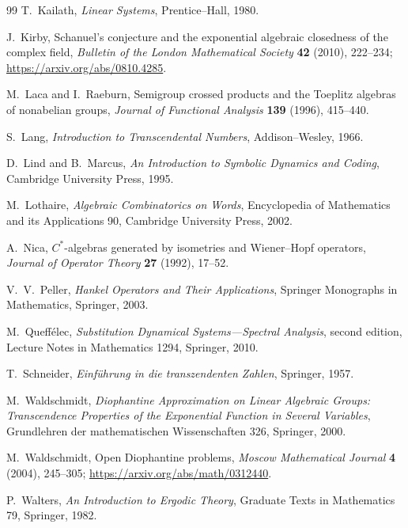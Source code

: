 \documentclass[11pt,oneside]{article}
\theoremstyle{definition}
\theoremstyle{remark}
\begin{document}
\begin{thebibliography}{99}
T.~Kailath,
\newblock \emph{Linear Systems},
\newblock Prentice--Hall, 1980.

J.~Kirby,
\newblock Schanuel's conjecture and the exponential algebraic closedness
of the complex field,
\newblock \emph{Bulletin of the London Mathematical Society}
\textbf{42} (2010), 222--234;
\newblock \url{https://arxiv.org/abs/0810.4285}.

M.~Laca and I.~Raeburn,
\newblock Semigroup crossed products and the Toeplitz algebras of
nonabelian groups,
\newblock \emph{Journal of Functional Analysis} \textbf{139} (1996),
415--440.

S.~Lang,
\newblock \emph{Introduction to Transcendental Numbers},
\newblock Addison--Wesley, 1966.

D.~Lind and B.~Marcus,
\newblock \emph{An Introduction to Symbolic Dynamics and Coding},
\newblock Cambridge University Press, 1995.

M.~Lothaire,
\newblock \emph{Algebraic Combinatorics on Words},
\newblock Encyclopedia of Mathematics and its Applications 90,
Cambridge University Press, 2002.

A.~Nica,
\newblock \(C^*\)-algebras generated by isometries and Wiener--Hopf
operators,
\newblock \emph{Journal of Operator Theory} \textbf{27} (1992), 17--52.

V.~V.~Peller,
\newblock \emph{Hankel Operators and Their Applications},
\newblock Springer Monographs in Mathematics, Springer, 2003.

M.~Queff\'elec,
\newblock \emph{Substitution Dynamical Systems---Spectral Analysis},
\newblock second edition, Lecture Notes in Mathematics 1294, Springer,
2010.

T.~Schneider,
\newblock \emph{Einf\"uhrung in die transzendenten Zahlen},
\newblock Springer, 1957.

M.~Waldschmidt,
\newblock \emph{Diophantine Approximation on Linear Algebraic Groups:
Transcendence Properties of the Exponential Function in Several
Variables},
\newblock Grundlehren der mathematischen Wissenschaften 326, Springer,
2000.

M.~Waldschmidt,
\newblock Open Diophantine problems,
\newblock \emph{Moscow Mathematical Journal} \textbf{4} (2004), 245--305;
\newblock \url{https://arxiv.org/abs/math/0312440}.

P.~Walters,
\newblock \emph{An Introduction to Ergodic Theory},
\newblock Graduate Texts in Mathematics 79, Springer, 1982.

\end{thebibliography}
\end{document}
